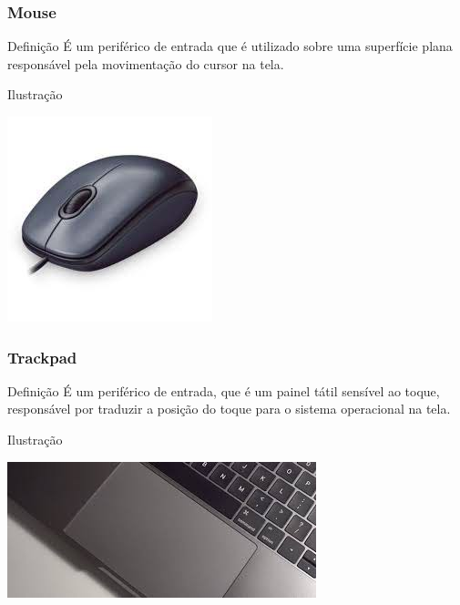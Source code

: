 \documentclass[aspectratio=169]{beamer} %
\begin{document}
\begin{frame}
	\frametitle{Mouse}
	
	\begin{block}{Defini\c cão}
		É um periférico de entrada que é utilizado sobre uma superfície plana responsável pela movimenta\c cão do cursor na tela.
	\end{block}\vfill
	
	\begin{exampleblock}{Ilustra\c cão}
		\begin{center}
			\includegraphics[scale=0.4]{img/mouse}
		\end{center}		
	\end{exampleblock}
\end{frame}

\begin{frame}
	\frametitle{Trackpad}
	
	\begin{block}{Defini\c cão}
		É um periférico de entrada, que é um painel tátil sensível ao toque, responsável por traduzir a posição do toque para o sistema operacional na tela.
	\end{block}\vfill
	
	\begin{exampleblock}{Ilustra\c cão}
		\begin{center}
			\includegraphics[scale=0.4]{img/trackpad}
		\end{center}		
	\end{exampleblock}
\end{frame}
\end{document}
